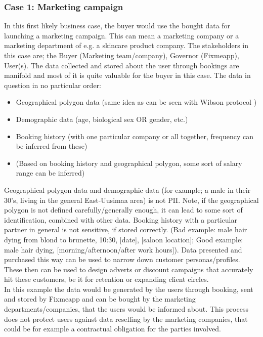 \documentclass[english, 12pt, a4paper, sci, utf8, a-2b, online]{aaltothesis}
\theoremstyle{change}
\theoremstyle{theoremstyle}
\begin{document}
\subsubsection{Case 1: Marketing campaign}
In this first likely business case, the buyer would use the bought data for launching a marketing campaign. This can mean a marketing company or a marketing department of e.g. a skincare product company. The stakeholders in this case are; the Buyer (Marketing team/company), Governor (Fixmeapp), User(s). The data collected and stored about the user through bookings are manifold and most of it is quite valuable for the buyer in this case. The data in question in no particular order:
\begin{itemize}
    \item Geographical polygon data (same idea as can be seen with Wibson protocol \cite{futoransky2020wibsontree})
    \item Demographic data (age, biological sex OR gender, etc.)
    \item Booking history (with one particular company or all together, frequency can be inferred from these)
    \item (Based on booking history and geographical polygon, some sort of salary range can be inferred) %
\end{itemize}
Geographical polygon data and demographic data (for example; a male in their 30's, living in the general East-Uusimaa area) is not PII. Note, if the geographical polygon is not defined carefully/generally enough, it can lead to some sort of identification, combined with other data. Booking history with a particular partner in general is not sensitive, if stored correctly. (Bad example: male hair dying from blond to brunette, 10:30, [date], [saloon location]; Good example: male hair dying, [morning/afternoon/after work hours]). Data presented and purchased this way can be used to narrow down customer personas/profiles. These then can be used to design adverts or discount campaigns that accurately hit these customers, be it for retention or expanding client circles.\\
In this example the data would be generated by the users through booking, sent and stored by Fixmeapp and can be bought by the marketing departments/companies, that the users would be informed about. This process does not protect users against data reselling by the marketing companies, that could be for example a contractual obligation for the parties involved.\\
\end{document}
